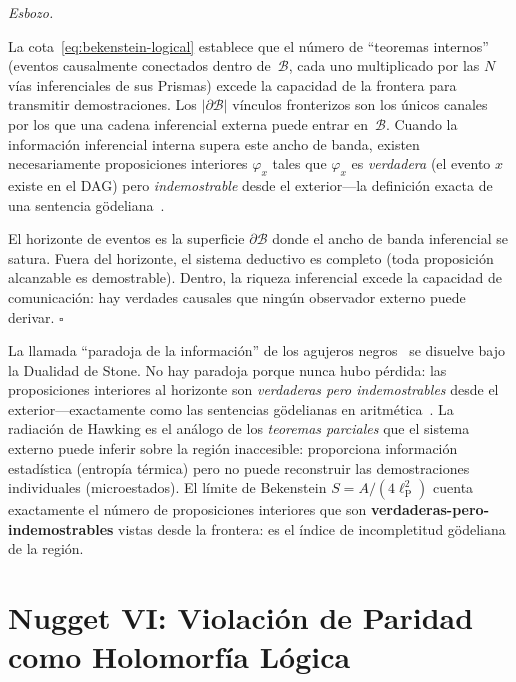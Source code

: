 \documentclass[11pt, a4paper, openany]{book}
\newcommand{\lP}{\ell_{\mathrm{P}}}
\renewenvironment{proof}[1][Demostraci\'on]{%
  \par\noindent\textit{#1.}\quad
}{\hfill$\square$\par\medskip}
\begin{document}
\begin{proof}[Esbozo]
La cota~\eqref{eq:bekenstein-logical} establece que el n\'umero de
``teoremas internos'' (eventos causalmente conectados dentro
de~$\mathcal{B}$, cada uno multiplicado por las $N$ v\'ias
inferenciales de sus Prismas) excede la capacidad de la frontera para
transmitir demostraciones. Los $|\partial \mathcal{B}|$ v\'inculos
fronterizos son los \'unicos canales por los que una cadena
inferencial externa puede entrar en~$\mathcal{B}$. Cuando la
informaci\'on inferencial interna supera este ancho de banda, existen
necesariamente proposiciones interiores $\varphi_x$ tales que
$\varphi_x$ es \emph{verdadera} (el evento $x$ existe en el DAG)
pero \emph{indemostrable} desde el exterior---la definici\'on exacta
de una sentencia g\"odeliana~\cite{godel1931}.

El horizonte de eventos es la superficie $\partial \mathcal{B}$ donde
el ancho de banda inferencial se satura. Fuera del horizonte, el
sistema deductivo es completo (toda proposici\'on alcanzable es
demostrable). Dentro, la riqueza inferencial excede la capacidad de
comunicaci\'on: hay verdades causales que ning\'un observador externo
puede derivar.
\end{proof}

\begin{result}[title={La Paradoja de la Informaci\'on como
Incompletitud}]
\label{res:stone-information-paradox}
La llamada ``paradoja de la informaci\'on'' de los agujeros
negros~\cite{hawking1975} se disuelve bajo la Dualidad de Stone. No
hay paradoja porque nunca hubo p\'erdida: las proposiciones interiores
al horizonte son \emph{verdaderas pero indemostrables} desde el
exterior---exactamente como las sentencias g\"odelianas en
aritm\'etica~\cite{godel1931}. La radiaci\'on de Hawking es el
an\'alogo de los \emph{teoremas parciales} que el sistema externo
puede inferir sobre la regi\'on inaccesible: proporciona informaci\'on
estad\'istica (entrop\'ia t\'ermica) pero no puede reconstruir las
demostraciones individuales (microestados). El l\'imite de Bekenstein
$S = A/(4\lP^2)$ cuenta exactamente el n\'umero de proposiciones
interiores que son \textbf{verdaderas-pero-indemostrables} vistas
desde la frontera: es el \'indice de incompletitud g\"odeliana de la
regi\'on.
\end{result}

\section{Nugget VI: Violaci\'on de Paridad como Holomorf\'ia L\'ogica}
\end{document}
